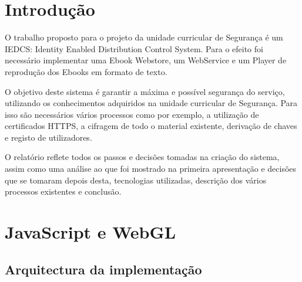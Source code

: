 \documentclass[pdftex,12pt,a4paper]{report}
\begin{document}
\renewcommand{\headrulewidth}{0pt}

\fancyhead{}
\fancyfoot{}
\rfoot{\thepage}

\renewcommand*\contentsname{Conteúdos}
\renewcommand*\figurename{Figura}
\renewcommand*\tablename{Tabela}

\tableofcontents
\renewcommand{\headrulewidth}{0.15pt}
\renewcommand{\thechapter}{}

\clearpage

\section{Introdução}
O trabalho proposto para o projeto da unidade curricular de Segurança é um IEDCS: Identity Enabled Distribution Control System. Para o  efeito foi necessário implementar uma Ebook Webstore, um WebService e um Player de reprodução dos Ebooks em formato de texto.

O objetivo deste sistema é garantir a máxima e possível segurança do serviço, utilizando os conhecimentos adquiridos na unidade curricular de Segurança. Para isso são necessários vários processos como por exemplo, a utilização de certificados HTTPS, a cifragem de todo o material existente, derivação de chaves e registo de utilizadores.	

O relatório reflete todos os passos e decisões tomadas na criação do sistema, assim como uma análise ao que foi mostrado na primeira apresentação e decisões que se tomaram depois desta, tecnologias utilizadas, descrição dos vários processos existentes e conclusão.

\clearpage

\section{JavaScript e WebGL}

\subsection{Arquitectura da implementação}
\end{document}
